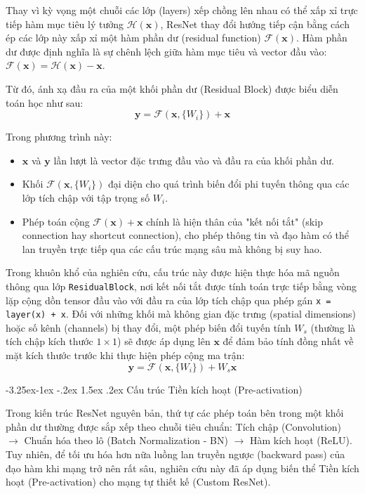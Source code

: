 \documentclass[a4paper]{article}
\makeatletter
\theoremstyle{definition}
\newcounter {subsubsubsection}[subsubsection]
\newcommand\subsubsubsection{\@startsection{subsubsubsection}{4}{\z@}%
                                     {-3.25ex\@plus -1ex \@minus -.2ex}%
                                     {1.5ex \@plus .2ex}%
                                     {\normalfont\normalsize\bfseries}}
\makeatother
\begin{document}
Thay vì kỳ vọng một chuỗi các lớp (layers) xếp chồng lên nhau có thể xấp xỉ trực tiếp hàm mục tiêu lý tưởng $\mathcal{H}(\mathbf{x})$, ResNet thay đổi hướng tiếp cận bằng cách ép các lớp này xấp xỉ một hàm phần dư (residual function) $\mathcal{F}(\mathbf{x})$. Hàm phần dư được định nghĩa là sự chênh lệch giữa hàm mục tiêu và vector đầu vào: $\mathcal{F}(\mathbf{x}) = \mathcal{H}(\mathbf{x}) - \mathbf{x}$.

Từ đó, ánh xạ đầu ra của một khối phần dư (Residual Block) được biểu diễn toán học như sau:
\begin{equation}
	\mathbf{y} = \mathcal{F}(\mathbf{x}, \{W_i\}) + \mathbf{x}
\end{equation}

Trong phương trình này:
\begin{itemize}
	\item $\mathbf{x}$ và $\mathbf{y}$ lần lượt là vector đặc trưng đầu vào và đầu ra của khối phần dư.
	\item Khối $\mathcal{F}(\mathbf{x}, \{W_i\})$ đại diện cho quá trình biến đổi phi tuyến thông qua các lớp tích chập với tập trọng số $W_i$.
	\item Phép toán cộng $\mathcal{F}(\mathbf{x}) + \mathbf{x}$ chính là hiện thân của "kết nối tắt" (skip connection hay shortcut connection), cho phép thông tin và đạo hàm có thể lan truyền trực tiếp qua các cấu trúc mạng sâu mà không bị suy hao.
\end{itemize}

Trong khuôn khổ của nghiên cứu, cấu trúc này được hiện thực hóa mã nguồn thông qua lớp \texttt{ResidualBlock}, nơi kết nối tắt được tính toán trực tiếp bằng vòng lặp cộng dồn tensor đầu vào với đầu ra của lớp tích chập qua phép gán \texttt{x = layer(x) + x}. Đối với những khối mà không gian đặc trưng (spatial dimensions) hoặc số kênh (channels) bị thay đổi, một phép biến đổi tuyến tính $W_s$ (thường là tích chập kích thước $1 \times 1$) sẽ được áp dụng lên $\mathbf{x}$ để đảm bảo tính đồng nhất về mặt kích thước trước khi thực hiện phép cộng ma trận:
\begin{equation}
	\mathbf{y} = \mathcal{F}(\mathbf{x}, \{W_i\}) + W_s \mathbf{x}
\end{equation}

\subsubsubsection{Cấu trúc Tiền kích hoạt (Pre-activation)}

Trong kiến trúc ResNet nguyên bản, thứ tự các phép toán bên trong một khối phần dư thường được sắp xếp theo chuỗi tiêu chuẩn: Tích chập (Convolution) $\rightarrow$ Chuẩn hóa theo lô (Batch Normalization - BN) $\rightarrow$ Hàm kích hoạt (ReLU). Tuy nhiên, để tối ưu hóa hơn nữa luồng lan truyền ngược (backward pass) của đạo hàm khi mạng trở nên rất sâu, nghiên cứu này đã áp dụng biến thể Tiền kích hoạt (Pre-activation) cho mạng tự thiết kế (Custom ResNet).
\end{document}
